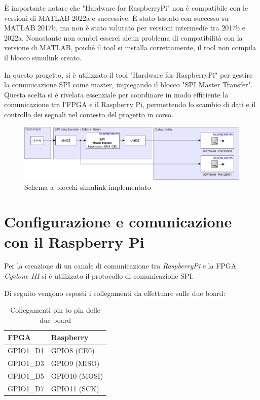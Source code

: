 \documentclass[titlepage]{report}
\begin{document}
		È importante notare che "Hardware for RaspberryPi" non è compatibile con le versioni di MATLAB 2022a e successive. È stato testato con successo su MATLAB 2017b, ma non è stato valutato per versioni intermedie tra 2017b e 2022a. Nonostante non sembri esserci alcun problema di compatibilità con la versione di MATLAB, poiché il tool si installa correttamente, il tool non compila il blocco simulink creato.

		In questo progetto, si è utilizzato il tool "Hardware for RaspberryPi" per gestire la comunicazione SPI come master, impiegando il blocco "SPI Master Transfer". Questa scelta si è rivelata essenziale per coordinare in modo efficiente la comunicazione tra l'FPGA e il Raspberry Pi, permettendo lo scambio di dati e il controllo dei segnali nel contesto del progetto in corso.

		\begin{figure}[ht]
			\centering
			\includegraphics[scale=0.6]{./img/test_raspi_psed_single.pdf}
			\caption{Schema a blocchi simulink implementato}
			\label{fig:simulink_sch}
		\end{figure}

	\section{Configurazione e comunicazione con il Raspberry Pi}
	\label{sec:configurazione_raspberrypi}
			
		Per la creazione di un canale di comunicazione tra \textit{RaspberryPi} e la FPGA \textit{Cyclone III} si è utilizzato il protocollo di comunicazione SPI.

		Di seguito vengono esposti i collegamenti da effettuare sulle due board:

		\begin{table}[ht]
			\centering
			\begin{tabular}{|l|l|}
				\rowcolor{gray!25} %
				\hline
				\textbf{FPGA} & \textbf{Raspberry} \\
				\hline
				GPIO1\_D1 & GPIO8 (CE0) \\
				\hline
				GPIO1\_D3 & GPIO9 (MISO) \\
				\hline
				GPIO1\_D5 & GPIO10 (MOSI) \\
				\hline
				GPIO1\_D7 & GPIO11 (SCK) \\
				\hline
			\end{tabular}
			\caption{Collegamenti pin to pin delle due board}
			\label{tab:wiring}
		\end{table}
\end{document}
